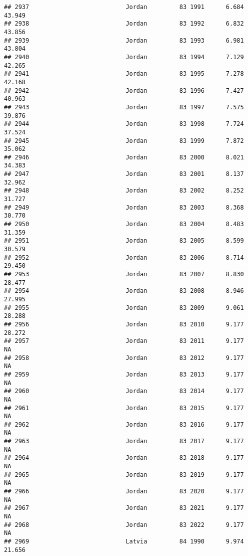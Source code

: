 \documentclass[
]{article}
\begin{document}
\begin{verbatim}
## 2937                           Jordan         83 1991      6.684     43.949
## 2938                           Jordan         83 1992      6.832     43.856
## 2939                           Jordan         83 1993      6.981     43.804
## 2940                           Jordan         83 1994      7.129     42.265
## 2941                           Jordan         83 1995      7.278     42.168
## 2942                           Jordan         83 1996      7.427     40.963
## 2943                           Jordan         83 1997      7.575     39.876
## 2944                           Jordan         83 1998      7.724     37.524
## 2945                           Jordan         83 1999      7.872     35.062
## 2946                           Jordan         83 2000      8.021     34.383
## 2947                           Jordan         83 2001      8.137     32.962
## 2948                           Jordan         83 2002      8.252     31.727
## 2949                           Jordan         83 2003      8.368     30.770
## 2950                           Jordan         83 2004      8.483     31.359
## 2951                           Jordan         83 2005      8.599     30.579
## 2952                           Jordan         83 2006      8.714     29.450
## 2953                           Jordan         83 2007      8.830     28.477
## 2954                           Jordan         83 2008      8.946     27.995
## 2955                           Jordan         83 2009      9.061     28.288
## 2956                           Jordan         83 2010      9.177     28.272
## 2957                           Jordan         83 2011      9.177         NA
## 2958                           Jordan         83 2012      9.177         NA
## 2959                           Jordan         83 2013      9.177         NA
## 2960                           Jordan         83 2014      9.177         NA
## 2961                           Jordan         83 2015      9.177         NA
## 2962                           Jordan         83 2016      9.177         NA
## 2963                           Jordan         83 2017      9.177         NA
## 2964                           Jordan         83 2018      9.177         NA
## 2965                           Jordan         83 2019      9.177         NA
## 2966                           Jordan         83 2020      9.177         NA
## 2967                           Jordan         83 2021      9.177         NA
## 2968                           Jordan         83 2022      9.177         NA
## 2969                           Latvia         84 1990      9.974     21.656

\end{verbatim}
\end{document}
